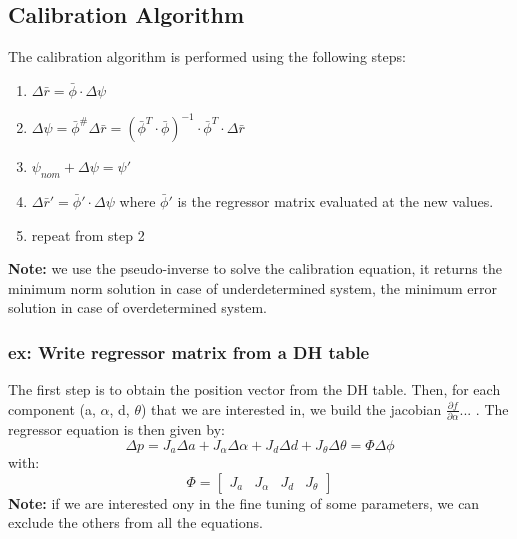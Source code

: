 \documentclass[a4paper,12pt]{article}
\begin{document}
\subsection{Calibration Algorithm}
The calibration algorithm is performed using the following steps:
\begin{enumerate}
    \item $\Delta \bar{r}= \bar{\phi} \cdot \Delta \psi$
    \item $\Delta \psi = \bar{\phi}^\# \Delta\bar{r}= (\bar{\phi}^T \cdot \bar{\phi})^{-1} \cdot \bar{\phi}^T \cdot \Delta \bar{r}$
    \item $ \psi_{nom} + \Delta \psi = \psi ' $
    \item $ \Delta \bar{r}' = \bar{\phi}' \cdot \Delta \psi$ where $\bar{\phi}'$ is the regressor
     matrix evaluated at the new values.
    \item repeat from step 2
\end{enumerate}
\textbf{Note:} we use the pseudo-inverse to solve the calibration equation,
it returns the minimum norm solution in case of underdetermined system,
the minimum error solution in case of overdetermined system.
\subsubsection{ex: Write regressor matrix from a DH table}
The first step is to obtain the position vector from the DH table.
Then, for each component (a, $\alpha$, d, $\theta$) that we are interested in, we
build the jacobian $ \frac{\partial f}{\partial \alpha} $... .
The regressor equation is then given by:
\begin{equation}
    \Delta p = J_a \Delta a + J_{\alpha} \Delta \alpha + J_d \Delta d + J_{\theta} \Delta \theta= \Phi \Delta \phi
\end{equation}
with:
\begin{equation}
    \Phi = \begin{bmatrix}
        J_a & J_{\alpha} & J_d & J_{\theta}
    \end{bmatrix}
\end{equation}
\textbf{Note:} if we are interested ony in the fine tuning of some parameters, we can
exclude the others from all the equations.
\end{document}
